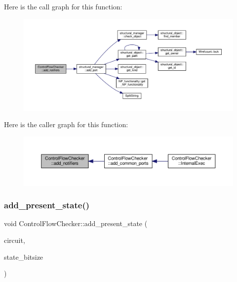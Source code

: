 Here is the call graph for this function\+:
\nopagebreak
\begin{figure}[H]
\begin{center}
\leavevmode
\includegraphics[width=350pt]{d0/dea/classControlFlowChecker_a99cb7891e87b906171c4330e53a96da7_cgraph}
\end{center}
\end{figure}
Here is the caller graph for this function\+:
\nopagebreak
\begin{figure}[H]
\begin{center}
\leavevmode
\includegraphics[width=350pt]{d0/dea/classControlFlowChecker_a99cb7891e87b906171c4330e53a96da7_icgraph}
\end{center}
\end{figure}
\mbox{\label{classControlFlowChecker_ac5e7bcac34c385399655961eebc4ee59}} 
\subsubsection{\texorpdfstring{add\+\_\+present\+\_\+state()}{add\_present\_state()}}
{\footnotesize\ttfamily void Control\+Flow\+Checker\+::add\+\_\+present\+\_\+state (\begin{DoxyParamCaption}\item[{\hyperlink{structural__objects_8hpp_a8ea5f8cc50ab8f4c31e2751074ff60b2}{structural\+\_\+object\+Ref}}]{circuit,  }\item[{unsigned int}]{state\+\_\+bitsize }\end{DoxyParamCaption})\hspace{0.3cm}{\ttfamily [protected]}}

